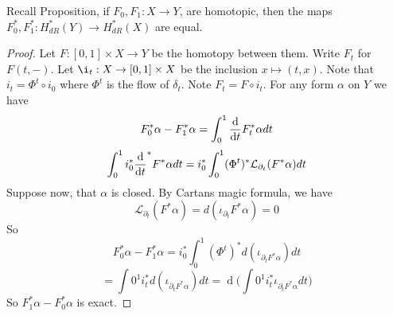 \documentclass{article}
\numberwithin{theorem}{section}
\renewcommand{\d}[1]{\ensuremath{\operatorname{d}\!{#1}}}
\newcommand{\1}{\mathds{1}}
\begin{document}
Recall Proposition, if $F_0, F_1: X\to Y$, are homotopic, then the maps 
$F_0^* ,F_1^*: H_{dR}^*(Y) \to H_{dR}^*(X)$ are equal. 
\begin{proof}
    Let $F:[0,1]\times X \to Y$ be the homotopy between them. Write $F_t$ for 
    $F(t,-)$. Let $\i_t: X\to [0,1]\times X$ be the inclusion $x \mapsto (t,x)$. 
    Note that $i_t = \Phi^t \circ i_0$ where $\Phi^t$ is the flow of $\delta_t$. 
    Note $F_t = F\circ i_t$. For any form $\alpha$ on $Y$ we have 
    \[ F^*_0 \alpha - F^*_1 \alpha = \int_0^1 \dv{}{t} F^*_t\alpha dt  \]
    \[ \int_0^1 i^*_0 \dv{}{t} (\Phi^t)^* F^*\alpha dt  = i^*_0 \int_0^1(\Phi^t)^*\mathcal{L}_{\partial_t}(F^*\alpha) dt\]
    Suppose now, that $\alpha$ is closed. By Cartans magic formula, we have 
    \[ \mathcal{L}_{\partial_t}(F^*\alpha) = d(\iota_{\partial_t}F^*\alpha) = 0\]
    So 
    \[ F^*_0\alpha - F^*_1\alpha = i_0^* \int_0^1 (\Phi^t)^*d(\iota_{\partial_tF^* \alpha}) dt \]
    \[ = \int0^1 i^*_t d(\iota_{\partial_tF^* \alpha}) dt = \d ( \int0^1 i^*_t \iota_{\partial_tF^* \alpha} dt) \] 
    So $F^*_1\alpha - F^*_0\alpha$ is exact. 


\end{proof}


\appendix
\end{document}
